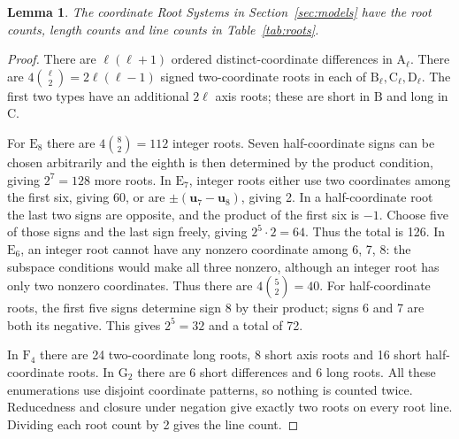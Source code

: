 \documentclass[11pt]{amsart}
\newcommand\Zu{{\mathbf u}}
\newtheorem{lemma}[theorem]{Lemma}
\theoremstyle{definition}
\newcommand{\typ}[1]{\mathrm{#1}}
\begin{document}
\begin{lemma}\label{lem:counts}
The coordinate Root Systems in Section~\ref{sec:models} have the root
counts, length counts and line counts in Table~\ref{tab:roots}.
\end{lemma}
\begin{proof}
There are $\ell(\ell+1)$ ordered distinct-coordinate differences in
$\typ A_\ell$. There are $4\binom\ell2=2\ell(\ell-1)$ signed
two-coordinate roots in each of $\typ B_\ell,\typ C_\ell,\typ D_\ell$.
The first two types have an additional $2\ell$ axis roots; these are
short in $\typ B$ and long in $\typ C$.

For $\typ E_8$ there are $4\binom82=112$ integer roots.
Seven half-coordinate signs can be chosen arbitrarily and the eighth is
then determined by the product condition, giving $2^7=128$ more roots.
In $\typ E_7$, integer roots either use two coordinates among the first
six, giving 60, or are $\pm(\Zu_7-\Zu_8)$, giving 2. In a half-coordinate
root the last two signs are opposite, and the product of the first six
is $-1$. Choose five of those signs and the last sign freely, giving
$2^5\cdot2=64$. Thus the total is 126.
In $\typ E_6$, an integer root cannot have any nonzero coordinate among
6, 7, 8: the subspace conditions would make all three nonzero, although
an integer root has only two nonzero coordinates. Thus there are
$4\binom52=40$. For half-coordinate roots, the first five signs
determine sign 8 by their product; signs 6 and 7 are both its negative.
This gives $2^5=32$ and a total of 72.

In $\typ F_4$ there are 24 two-coordinate long roots, 8 short axis roots
and 16 short half-coordinate roots. In $\typ G_2$ there are 6 short
differences and 6 long roots. All these enumerations use disjoint
coordinate patterns, so nothing is counted twice. Reducedness and
closure under negation give exactly two roots on every root line.
Dividing each root count by 2 gives the line count.
\end{proof}
\end{document}

